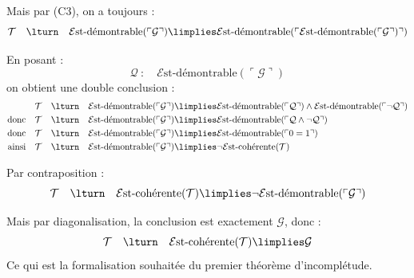 \documentclass[11pt,class=report,crop=false]{standalone}
\begin{document}
Mais par (C3), on a toujours :
\[ \mathcal{T} \quad \lturn \quad \mathcal{E}\text{st-démontrable}(\ulcorner \mathcal{G} \urcorner) \limplies  \mathcal{E}\text{st-démontrable}(\ulcorner \mathcal{E}\text{st-démontrable}(\ulcorner \mathcal{G} \urcorner) \urcorner) \]


En posant :
\[
\mathcal{Q} \ : \quad  \mathcal{E}\text{st-démontrable}(\ulcorner \mathcal{G} \urcorner)
\]
on obtient une double conclusion :
\begin{align*}
    & \mathcal{T} \quad \lturn \quad  
    \mathcal{E}\text{st-démontrable}(\ulcorner \mathcal{G} \urcorner) \limplies 
    \mathcal{E}\text{st-démontrable}(\ulcorner \mathcal{Q} \urcorner) \land \mathcal{E}\text{st-démontrable}(\ulcorner \lnot \mathcal{Q} \urcorner)\\
    \text{donc} \quad & \mathcal{T} \quad \lturn \quad 
    \mathcal{E}\text{st-démontrable}(\ulcorner \mathcal{G} \urcorner) \limplies 
    \mathcal{E}\text{st-démontrable}(\ulcorner \mathcal{Q} \land \lnot \mathcal{Q} \urcorner) \\
    \text{donc} \quad & \mathcal{T} \quad \lturn \quad 
   \mathcal{E}\text{st-démontrable}(\ulcorner \mathcal{G} \urcorner) \limplies 
   \mathcal{E}\text{st-démontrable}(\ulcorner 0=1 \urcorner)  \\
    \text{ainsi} \quad & \mathcal{T} \quad \lturn \quad 
   \mathcal{E}\text{st-démontrable}(\ulcorner \mathcal{G} \urcorner) \limplies 
   \lnot\mathcal{E}\text{st-cohérente}(\mathcal{T})  \\
\end{align*}


Par contraposition :
\[ \mathcal{T} \quad \lturn \quad \mathcal{E}\text{st-cohérente}(\mathcal{T}) \limplies \lnot \mathcal{E}\text{st-démontrable}(\ulcorner \mathcal{G} \urcorner) \]

Mais par diagonalisation, la conclusion est exactement $\mathcal{G}$, donc :
\[ \mathcal{T} \quad \lturn \quad \mathcal{E}\text{st-cohérente}(\mathcal{T}) \limplies \mathcal{G} \]
Ce qui est la formalisation souhaitée du premier théorème d'incomplétude.




\begin{exercicecours}

\end{exercicecours}

\end{document}
